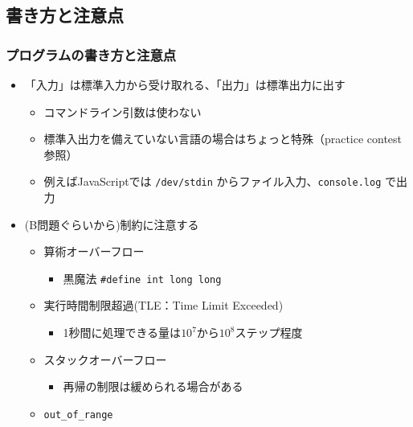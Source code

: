 \documentclass[t, aspectratio=169, dvipdfmx]{beamer}
\begin{document}
\subsection{書き方と注意点}
\begin{frame}[containsverbatim]
  \frametitle{プログラムの書き方と注意点}
  \begin{itemize}
    \item 「入力」は標準入力から受け取れる、「出力」は標準出力に出す
    \begin{itemize}
      \item コマンドライン引数は使わない
      \item 標準入出力を備えていない言語の場合はちょっと特殊（practice contest参照）
      \item 例えばJavaScriptでは \verb|/dev/stdin| からファイル入力、\verb|console.log| で出力
    \end{itemize}
    \item (B問題ぐらいから)制約に注意する
    \begin{itemize}
      \item 算術オーバーフロー
      \begin{itemize}
        \item 黒魔法 \verb|#define int long long|
      \end{itemize}
      \item 実行時間制限超過(TLE：Time Limit Exceeded)
      \begin{itemize}
        \item 1秒間に処理できる量は$10^7$から$10^8$ステップ程度
      \end{itemize}
      \item スタックオーバーフロー
      \begin{itemize}
        \item 再帰の制限は緩められる場合がある
      \end{itemize}
      \item \verb|out_of_range|
    \end{itemize}
  \end{itemize}
\end{frame}
\end{document}
